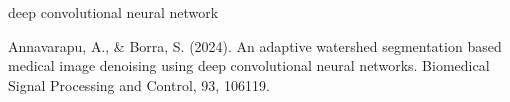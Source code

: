 deep convolutional neural network

Annavarapu, A., & Borra, S. (2024). An adaptive watershed segmentation based medical image denoising using deep convolutional neural networks. Biomedical Signal Processing and Control, 93, 106119.
